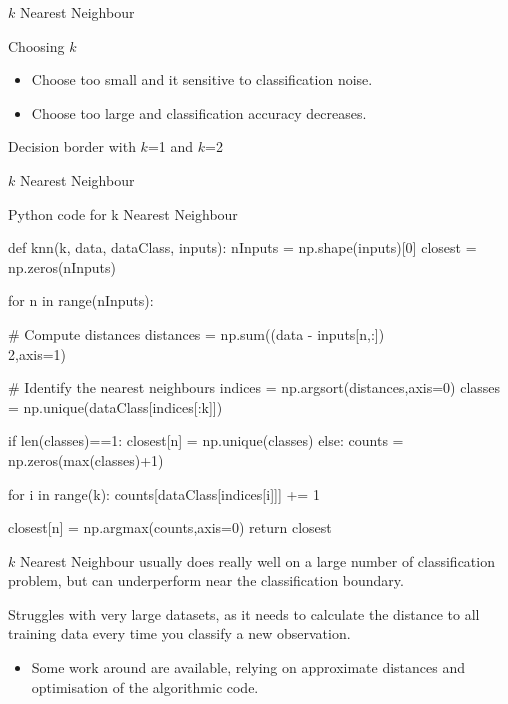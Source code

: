 \documentclass[compress]{beamer}
\begin{document}
\begin{frame}{\(k\) Nearest Neighbour}

Choosing \(k\)

\begin{itemize}

\item
  Choose too small and it sensitive to classification noise.
\item
  Choose too large and classification accuracy decreases.
\end{itemize}

Decision border with \(k\)=1 and \(k\)=2

\end{frame}

\begin{frame}[fragile]{\(k\) Nearest Neighbour}

\begin{block}{Python code for k Nearest Neighbour}

\begin{pythoncode}
def knn(k, data, dataClass, inputs):
  nInputs = np.shape(inputs)[0]
  closest = np.zeros(nInputs)

  for n in range(nInputs):
  
  # Compute distances
  distances = np.sum((data - inputs[n,:])\\2,axis=1)
  
  # Identify the nearest neighbours
  indices = np.argsort(distances,axis=0)
  classes = np.unique(dataClass[indices[:k]])
  
  if len(classes)==1:
    closest[n] = np.unique(classes)
  else:
    counts = np.zeros(max(classes)+1)
  
  for i in range(k):
    counts[dataClass[indices[i]]] += 1
  
  closest[n] = np.argmax(counts,axis=0)
  return closest
\end{pythoncode}



\(k\) Nearest Neighbour usually does really well on a large number of
classification problem, but can underperform near the classification
boundary.

Struggles with very large datasets, as it needs to calculate the
distance to all training data every time you classify a new observation.

\begin{itemize}

\item
  Some work around are available, relying on approximate distances and
  optimisation of the algorithmic code.
\end{itemize}

\end{block}

\end{frame}
\end{document}
